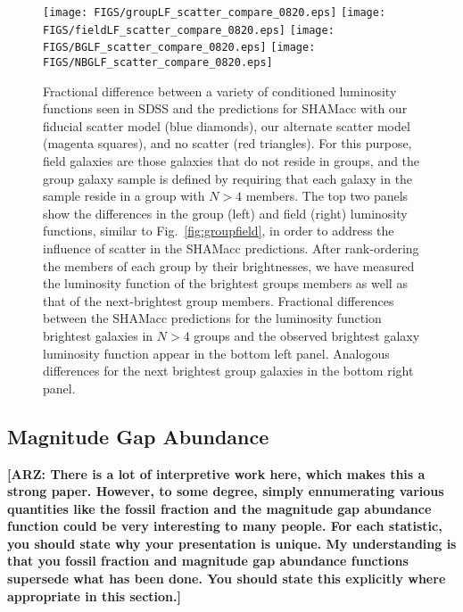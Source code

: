 \documentclass[usenatbib,usegraphicx,letterpaper]{mn2e}
\begin{document}
\begin{figure*}
\centering
\texttt{[image: FIGS/groupLF\_scatter\_compare\_0820.eps]}
\texttt{[image: FIGS/fieldLF\_scatter\_compare\_0820.eps]}
\texttt{[image: FIGS/BGLF\_scatter\_compare\_0820.eps]}
\texttt{[image: FIGS/NBGLF\_scatter\_compare\_0820.eps]}
\caption{
Fractional difference between a variety of conditioned luminosity functions seen in 
SDSS and the predictions for SHAMacc with our fiducial scatter model (blue diamonds), 
our alternate scatter model (magenta squares), and no scatter (red triangles). 
For this purpose, field galaxies are those galaxies that do not reside in groups, 
and the group galaxy sample is defined by requiring that each galaxy in the sample reside 
in a group with $N>4$ members. The top two panels show the differences in the group (left) 
and field (right) luminosity functions, similar to Fig.~\ref{fig:groupfield}, in order to 
address the influence of scatter in the SHAMacc predictions.  
After rank-ordering the members of each group by their 
brightnesses, we have measured the luminosity function of the brightest groups members as 
well as that of the next-brightest group members. Fractional differences between the SHAMacc 
predictions for the luminosity function brightest galaxies in $N>4$ groups and the observed 
brightest galaxy luminosity function appear in the bottom left panel.  Analogous 
differences for the next brightest group galaxies in the bottom right panel.
}
\label{fig:groupfieldscatter}
\end{figure*}


\subsection{Magnitude Gap Abundance}
\label{subsection:pgap}

{\bf [ARZ: There is a lot of interpretive work here, which makes this a strong paper.  
However, to some degree, simply ennumerating various quantities like the fossil 
fraction and the magnitude gap abundance function could be very interesting to many 
people.  For each statistic, you should state why your presentation is unique.  
My understanding is that you fossil fraction and magnitude gap abundance functions 
supersede what has been done.  You should state this explicitly where appropriate 
in this section.]}
\end{document}
